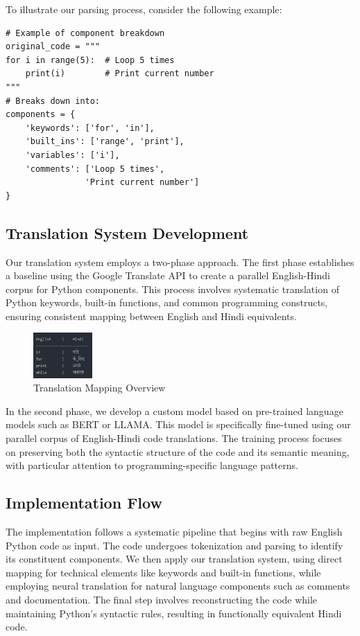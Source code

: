 \documentclass[9pt]{article}
\begin{document}
To illustrate our parsing process, consider the following example:

\begin{lstlisting}
# Example of component breakdown
original_code = """
for i in range(5):  # Loop 5 times
    print(i)        # Print current number
"""
# Breaks down into:
components = {
    'keywords': ['for', 'in'],
    'built_ins': ['range', 'print'],
    'variables': ['i'],
    'comments': ['Loop 5 times', 
                'Print current number']
}
\end{lstlisting}

\subsection{Translation System Development}
Our translation system employs a two-phase approach. The first phase establishes a baseline using the Google Translate API to create a parallel English-Hindi corpus for Python components. This process involves systematic translation of Python keywords, built-in functions, and common programming constructs, ensuring consistent mapping between English and Hindi equivalents.
\begin{figure}[h]
    \centering
    \includegraphics[width=0.2\textwidth]{english-hindi-translation-mapping.png}
    \caption{Translation Mapping Overview}
    \label{fig:translation_system}
\end{figure}
In the second phase, we develop a custom model based on pre-trained language models such as BERT or LLAMA. This model is specifically fine-tuned using our parallel corpus of English-Hindi code translations. The training process focuses on preserving both the syntactic structure of the code and its semantic meaning, with particular attention to programming-specific language patterns.

\subsection{Implementation Flow}
The implementation follows a systematic pipeline that begins with raw English Python code as input. The code undergoes tokenization and parsing to identify its constituent components. We then apply our translation system, using direct mapping for technical elements like keywords and built-in functions, while employing neural translation for natural language components such as comments and documentation. The final step involves reconstructing the code while maintaining Python's syntactic rules, resulting in functionally equivalent Hindi code.
\end{document}
